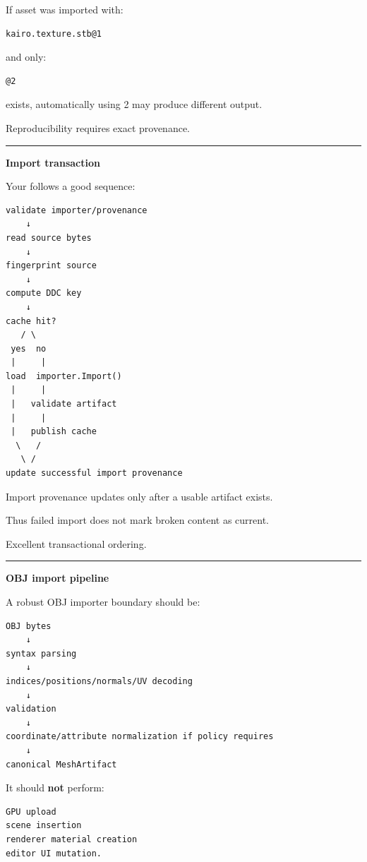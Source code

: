 If asset was imported with:

\begin{verbatim}
kairo.texture.stb@1
\end{verbatim}

and only:

\begin{verbatim}
@2
\end{verbatim}

exists, automatically using 2 may produce different output.

Reproducibility requires exact provenance.

\begin{center}\rule{0.5\linewidth}{0.5pt}\end{center}

\textbf{Import transaction}

Your  follows a good sequence:

\begin{verbatim}
validate importer/provenance
    ↓
read source bytes
    ↓
fingerprint source
    ↓
compute DDC key
    ↓
cache hit?
   / \
 yes  no
 |     |
load  importer.Import()
 |     |
 |   validate artifact
 |     |
 |   publish cache
  \   /
   \ /
update successful import provenance
\end{verbatim}

Import provenance updates only after a usable artifact exists.

Thus failed import does not mark broken content as current.

Excellent transactional ordering.

\begin{center}\rule{0.5\linewidth}{0.5pt}\end{center}

\textbf{OBJ import pipeline}

A robust OBJ importer boundary should be:

\begin{verbatim}
OBJ bytes
    ↓
syntax parsing
    ↓
indices/positions/normals/UV decoding
    ↓
validation
    ↓
coordinate/attribute normalization if policy requires
    ↓
canonical MeshArtifact
\end{verbatim}

It should \textbf{not} perform:

\begin{verbatim}
GPU upload
scene insertion
renderer material creation
editor UI mutation.
\end{verbatim}

